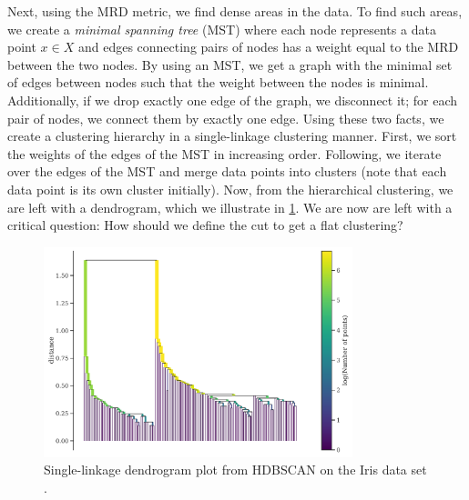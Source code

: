 Next, using the MRD metric, we find dense areas in the data. To find such areas, we create a \textit{minimal spanning tree} (MST) where each node represents a data point $x \in X$ and edges connecting pairs of nodes has a weight equal to the MRD between the two nodes. By using an MST, we get a graph with the minimal set of edges between nodes such that the weight between the nodes is minimal. Additionally, if we drop exactly one edge of the graph, we disconnect it; for each pair of nodes, we connect them by exactly one edge. Using these two facts, we create a clustering hierarchy in a single-linkage clustering manner. First, we sort the weights of the edges of the MST in increasing order. Following, we iterate over the edges of the MST and merge data points into clusters (note that each data point is its own cluster initially). Now, from the hierarchical clustering, we are left with a dendrogram, which we illustrate in \cref{fig:hdbscan-dendrogram-example}. We are now are left with a critical question: How should we define the cut to get a flat clustering?
\begin{figure}[H]
    \centering
    \includegraphics[width=0.8\textwidth]{thesis/figures/hdbscan-single-linage-tree-example.pdf}
    \caption{Single-linkage dendrogram plot from HDBSCAN on the Iris data set \cite{Anderson1936,Fisher1936}.}
    \label{fig:hdbscan-dendrogram-example}
\end{figure}

